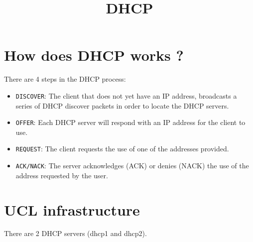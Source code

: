 \documentclass[10pt,a4paper]{article}
\title{DHCP}
\begin{document}
\maketitle
\section{How does DHCP works ?}
There are 4 steps in the DHCP process:
\begin{itemize}
\item \texttt{DISCOVER}: The client that does not yet have an IP address, broadcasts a series of DHCP discover packets in order to locate the DHCP servers.
\item \texttt{OFFER}: Each DHCP server will respond with an IP address for the client to use.
\item \texttt{REQUEST}: The client requests the use of one of the addresses provided.
\item \texttt{ACK/NACK}: The server acknowledges (ACK) or denies (NACK) the use of the address requested by the user.
\end{itemize}
\section{UCL infrastructure}
There are 2 DHCP servers (dhcp1 and dhcp2).
\end{document}
